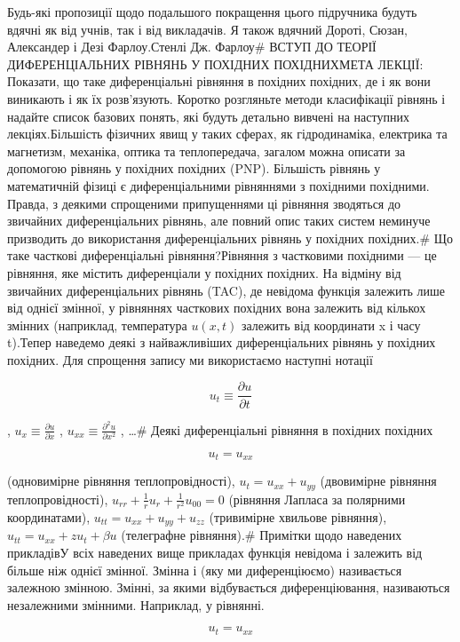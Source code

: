 \documentclass[
  ukrainian,
]{article}
\begin{document}
Будь-які пропозиції щодо подальшого покращення цього підручника будуть
вдячні як від учнів, так і від викладачів. Я також вдячний Дороті,
Сюзан, Александер і Дезі Фарлоу.Стенлі Дж. Фарлоу\# ВСТУП ДО ТЕОРІЇ
ДИФЕРЕНЦІАЛЬНИХ РІВНЯНЬ У ПОХІДНИХ ПОХІДНИХМЕТА ЛЕКЦІЇ: Показати, що
таке диференціальні рівняння в похідних похідних, де і як вони виникають
і як їх розв'язують. Коротко розгляньте методи класифікації рівнянь і
надайте список базових понять, які будуть детально вивчені на наступних
лекціях.Більшість фізичних явищ у таких сферах, як гідродинаміка,
електрика та магнетизм, механіка, оптика та теплопередача, загалом можна
описати за допомогою рівнянь у похідних похідних (PNP). Більшість
рівнянь у математичній фізиці є диференціальними рівняннями з похідними
похідними. Правда, з деякими спрощеними припущеннями ці рівняння
зводяться до звичайних диференціальних рівнянь, але повний опис таких
систем неминуче призводить до використання диференціальних рівнянь у
похідних похідних.\# Що таке часткові диференціальні рівняння?Рівняння з
частковими похідними --- це рівняння, яке містить диференціали у
похідних похідних. На відміну від звичайних диференціальних рівнянь
(TAC), де невідома функція залежить лише від однієї змінної, у рівняннях
часткових похідних вона залежить від кількох змінних (наприклад,
температура \(u(x, t)\) залежить від координати x і часу t).Тепер
наведемо деякі з найважливіших диференціальних рівнянь у похідних
похідних. Для спрощення запису ми використаємо наступні нотації

\[
u_t \equiv \frac{\partial u}{\partial t}
\]

, \(u_x \equiv \frac{\partial u}{\partial x}\) ,
\(u_{xx} \equiv \frac{\partial^2 u}{\partial x^2}\) , \ldots\# Деякі
диференціальні рівняння в похідних похідних

\[
u_t = u_{xx}
\]

(одновимірне рівняння теплопровідності), \(u_t = u_{xx} + u_{yy}\)
(двовимірне рівняння теплопровідності),
\(u_{rr} + \frac{1}{r}u_r + \frac{1}{r^2}u_{00} = 0\) (рівняння Лапласа
за полярними координатами), \(u_{tt} = u_{xx} + u_{yy} + u_{zz}\)
(тривимірне хвильове рівняння), \(u_{tt} = u_{xx} + zu_t + \beta u\)
(телеграфне рівняння).\# Примітки щодо наведених прикладівУ всіх
наведених вище прикладах функція невідома і залежить від більше ніж
однієї змінної. Змінна і (яку ми диференціюємо) називається залежною
змінною. Змінні, за якими відбувається диференціювання, називаються
незалежними змінними. Наприклад, у рівнянні.

\[
u_t = u_{xx}
\]
\end{document}
